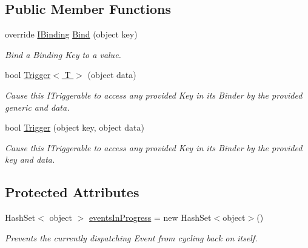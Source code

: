 \subsection*{Public Member Functions}
\begin{DoxyCompactItemize}
\item 
\hypertarget{classstrange_1_1extensions_1_1context_1_1impl_1_1_cross_context_bridge_aa7e3dbb298fa06272710bab69d790809}{override \hyperlink{interfacestrange_1_1framework_1_1api_1_1_i_binding}{I\-Binding} \hyperlink{classstrange_1_1extensions_1_1context_1_1impl_1_1_cross_context_bridge_aa7e3dbb298fa06272710bab69d790809}{Bind} (object key)}\label{classstrange_1_1extensions_1_1context_1_1impl_1_1_cross_context_bridge_aa7e3dbb298fa06272710bab69d790809}

\begin{DoxyCompactList}\small\item\em Bind a Binding Key to a value. \end{DoxyCompactList}\item 
bool \hyperlink{classstrange_1_1extensions_1_1context_1_1impl_1_1_cross_context_bridge_a157f6eacffbd81778369ac28b5bd9bcb}{Trigger$<$ T $>$} (object data)
\begin{DoxyCompactList}\small\item\em Cause this I\-Triggerable to access any provided Key in its Binder by the provided generic and data. \end{DoxyCompactList}\item 
bool \hyperlink{classstrange_1_1extensions_1_1context_1_1impl_1_1_cross_context_bridge_a003f8e51924275ecc81f591be5d12fa3}{Trigger} (object key, object data)
\begin{DoxyCompactList}\small\item\em Cause this I\-Triggerable to access any provided Key in its Binder by the provided key and data. \end{DoxyCompactList}\end{DoxyCompactItemize}
\subsection*{Protected Attributes}
\begin{DoxyCompactItemize}
\item 
\hypertarget{classstrange_1_1extensions_1_1context_1_1impl_1_1_cross_context_bridge_a8ccc8f8fa78e4bd6fd2db7741f16feaf}{Hash\-Set$<$ object $>$ \hyperlink{classstrange_1_1extensions_1_1context_1_1impl_1_1_cross_context_bridge_a8ccc8f8fa78e4bd6fd2db7741f16feaf}{events\-In\-Progress} = new Hash\-Set$<$object$>$()}\label{classstrange_1_1extensions_1_1context_1_1impl_1_1_cross_context_bridge_a8ccc8f8fa78e4bd6fd2db7741f16feaf}

\begin{DoxyCompactList}\small\item\em Prevents the currently dispatching Event from cycling back on itself. \end{DoxyCompactList}\end{DoxyCompactItemize}
